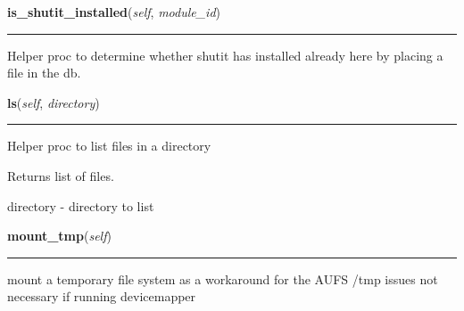     \vspace{0.5ex}

\hspace{.8\funcindent}\begin{boxedminipage}{\funcwidth}

    \raggedright \textbf{is\_shutit\_installed}(\textit{self}, \textit{module\_id})

    \vspace{-1.5ex}

    \rule{\textwidth}{0.5\fboxrule}
\setlength{\parskip}{2ex}
    Helper proc to determine whether shutit has installed already here by 
    placing a file in the db.

\setlength{\parskip}{1ex}
    \end{boxedminipage}

    \label{shutit_global:ShutIt:ls}

    \vspace{0.5ex}

\hspace{.8\funcindent}\begin{boxedminipage}{\funcwidth}

    \raggedright \textbf{ls}(\textit{self}, \textit{directory})

    \vspace{-1.5ex}

    \rule{\textwidth}{0.5\fboxrule}
\setlength{\parskip}{2ex}
    Helper proc to list files in a directory

    Returns list of files.

    directory - directory to list

\setlength{\parskip}{1ex}
    \end{boxedminipage}

    \label{shutit_global:ShutIt:mount_tmp}

    \vspace{0.5ex}

\hspace{.8\funcindent}\begin{boxedminipage}{\funcwidth}

    \raggedright \textbf{mount\_tmp}(\textit{self})

    \vspace{-1.5ex}

    \rule{\textwidth}{0.5\fboxrule}
\setlength{\parskip}{2ex}
    mount a temporary file system as a workaround for the AUFS /tmp issues 
    not necessary if running devicemapper

\setlength{\parskip}{1ex}
    \end{boxedminipage}

